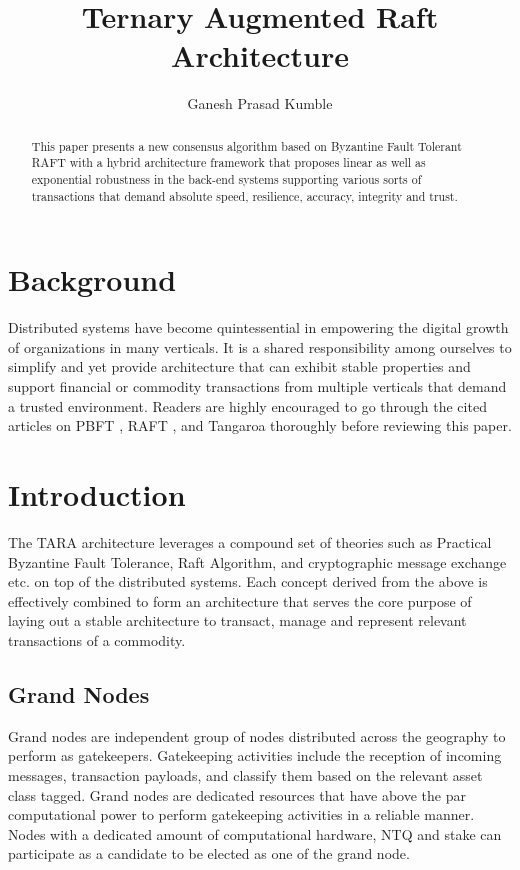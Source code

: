 \documentclass[]{article}
\title{Ternary Augmented Raft Architecture}
\author{Ganesh Prasad Kumble}
\begin{document}
\date{}
\maketitle

\begin{abstract}
This paper presents a new consensus algorithm based on Byzantine Fault Tolerant\cite{ARTICLE:1} RAFT \cite{ARTICLE:2} with a hybrid architecture framework that proposes linear as well as exponential robustness in the back-end systems supporting various sorts of transactions that demand absolute speed, resilience, accuracy, integrity and trust.
\end{abstract}

\section{Background}
Distributed systems have become quintessential in empowering the digital growth of organizations in many verticals. It is a shared responsibility among ourselves to simplify and yet provide architecture that can exhibit stable properties and support financial or commodity transactions from multiple verticals that demand a trusted environment. Readers are highly encouraged to go through the cited articles on PBFT \cite{ARTICLE:1}, RAFT \cite{ARTICLE:2}, and Tangaroa \cite{ARTICLE:3} thoroughly before reviewing this paper.

\section{Introduction}
The TARA architecture leverages a compound set of theories such as Practical Byzantine Fault Tolerance\cite{ARTICLE:1}, Raft Algorithm\cite{ARTICLE:2}, and cryptographic message exchange etc. on top of the distributed systems\cite{ARTICLE:3}. Each concept derived from the above is effectively combined to form an architecture that serves the core purpose of laying out a stable architecture to transact, manage and represent relevant transactions of a commodity.
\subsection{Grand Nodes}
Grand nodes are independent group of nodes distributed across the geography to perform as gatekeepers.
Gatekeeping activities include the reception of incoming messages, transaction payloads, and classify them based on the relevant asset class tagged.
Grand nodes are dedicated resources that have above the par computational power to perform gatekeeping activities in a reliable manner. Nodes with a dedicated amount of computational hardware, NTQ and stake can participate as a candidate to be elected as one of the grand node.
\end{document}
